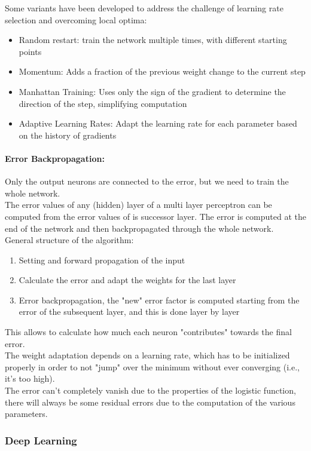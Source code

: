 \documentclass{article}
\begin{document}
	Some variants have been developed to address the challenge of learning rate selection and overcoming local optima:
	\begin{itemize}
		\item Random restart: train the network multiple times, with different starting points
		\item Momentum: Adds a fraction of the previous weight change to the current step
		\item Manhattan Training: Uses only the sign of the gradient to determine the direction of the step, simplifying computation
		\item Adaptive Learning Rates: Adapt the learning rate for each parameter based on the history of gradients
	\end{itemize}
	
	\paragraph{Error Backpropagation:} Only the output neurons are connected to the error, but we need to train the whole network. \\
	The error values of any (hidden) layer of a multi layer perceptron can be computed from the error values of is successor layer. The error is computed at the end of the network and then backpropagated through the whole network.\\
	General structure of the algorithm:
	\begin{enumerate}
		\item Setting and forward propagation of the input
		\item Calculate the error and adapt the weights for the last layer
		\item Error backpropagation, the "new" error factor is computed starting from the error of the subsequent layer, and this is done layer by layer
	\end{enumerate}
	This allows to calculate how much each neuron "contributes" towards the final error.\\
	
	The weight adaptation depends on a learning rate, which has to be initialized properly in order to not "jump" over the minimum without ever converging (i.e., it's too high).\\
	
	The error can’t completely vanish due to the properties of the logistic function, there will always be some residual errors due to the computation of the various parameters.\\
	
	\subsubsection{Deep Learning}
	
\end{document}
